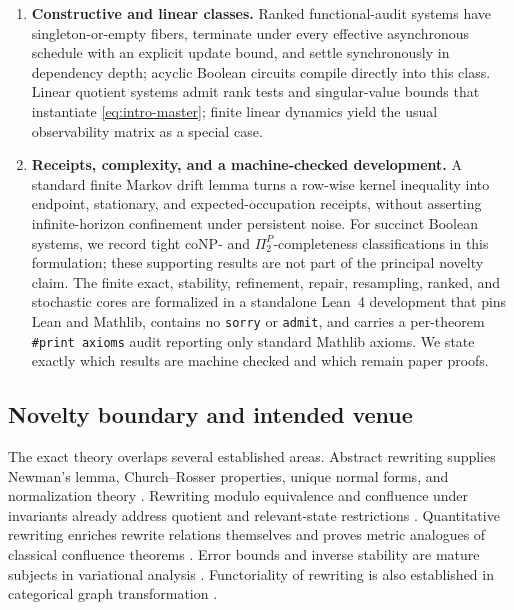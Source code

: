 \documentclass[11pt]{article}
\theoremstyle{definition}
\theoremstyle{remark}
\numberwithin{equation}{section}
\begin{document}
\begin{enumerate}[label=\textbf{C\arabic*.},leftmargin=3.2em]
\item \textbf{Constructive and linear classes.}
Ranked functional-audit systems have singleton-or-empty fibers, terminate under every effective asynchronous schedule with an explicit update bound, and settle synchronously in dependency depth; acyclic Boolean circuits compile directly into this class.  Linear quotient systems admit rank tests and singular-value bounds that instantiate \eqref{eq:intro-master}; finite linear dynamics yield the usual observability matrix as a special case.

\item \textbf{Receipts, complexity, and a machine-checked development.}
A standard finite Markov drift lemma turns a row-wise kernel inequality into endpoint, stationary, and expected-occupation receipts, without asserting infinite-horizon confinement under persistent noise.  For succinct Boolean systems, we record tight coNP- and $\Pi_2^P$-completeness classifications in this formulation; these supporting results are not part of the principal novelty claim.  The finite exact, stability, refinement, repair, resampling, ranked, and stochastic cores are formalized in a standalone Lean~4 development that pins Lean and Mathlib, contains no \texttt{sorry} or \texttt{admit}, and carries a per-theorem \texttt{\#print axioms} audit reporting only standard Mathlib axioms.  We state exactly which results are machine checked and which remain paper proofs.
\end{enumerate}

\subsection{Novelty boundary and intended venue}

The exact theory overlaps several established areas.  Abstract rewriting supplies Newman's lemma, Church--Rosser properties, unique normal forms, and normalization theory \citep{Newman1942,Huet1980,BaaderNipkow1998,Terese2003,AotoToyama2018}.  Rewriting modulo equivalence and confluence under invariants already address quotient and relevant-state restrictions \citep{ChristiansenKirkeby2016,GallFruehwirth2018,CampbellPlump2021,Lucas2025}.  Quantitative rewriting enriches rewrite relations themselves and proves metric analogues of classical confluence theorems \citep{GavazzoDiFlorio2022}.  Error bounds and inverse stability are mature subjects in variational analysis \citep{Kruger2015,CibulkaDontchevKruger2018}.  Functoriality of rewriting is also established in categorical graph transformation \citep{DuvalEchahedProst2011}.
\end{document}
